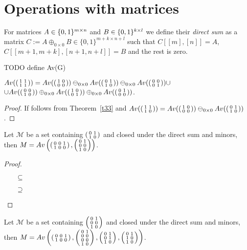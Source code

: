 \section{Operations with matrices}
\begin{defn}
For matrices $A\in\Mat$ and $B\in\Pat$ we define their \emph{direct sum} as a matrix $C:=A\oplus_{0\times0}B\in\{0,1\}^{m+k\times n+l}$ such that $C[[m],[n]]=A$, $C[[m+1,m+k],[n+1,n+l]]=B$ and the rest is zero.
\end{defn}
TODO define Av(G)
\begin{thm}
$Av(\smm{1&1\\1&1})=Av(\smm{1&0\\0&0})\ominus_{0\times0}Av(\smm{0&1\\1&0})\ominus_{0\times0}Av(\smm{0&0\\0&1})\cup$\\
$\cup Av(\smm{0&0\\1&0})\oplus_{0\times0}Av(\smm{1&0\\0&1})\oplus_{0\times0}Av(\smm{0&1\\0&0})$.
\end{thm}
\begin{proof}
If follows from Theorem~\ref{t33} and $Av(\smm{1&1\\1&0})=Av(\smm{1&0\\0&0})\ominus_{0\times0}Av(\smm{0&1\\1&0})$.
\end{proof}
\begin{thm}
Let $\mathcal{M}$ be a set containing $\smm{0&1\\1&0}$ and closed under the direct sum and minors, then $M=Av\left(\smm{0&0&1\\1&0&0},\smm{0&1\\0&0\\1&0}\right)$.
\end{thm}
\begin{proof}
\begin{itemize}
\item[$\subseteq$]
\item[$\supseteq$]
\end{itemize}
\end{proof}
\begin{thm}
Let $\mathcal{M}$ be a set containing $\smm{0&1\\0&0\\1&0}$ and closed under the direct sum and minors, then $M=Av\left(\smm{0&0&1\\1&0&0},\smm{0&1\\0&0\\0&0\\1&0},\smm{0&1\\0&1\\1&0},\smm{0&1\\1&0\\1&0}\right)$.
\end{thm}
